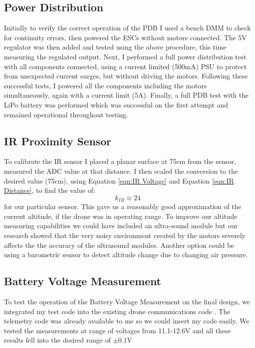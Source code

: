 \documentclass[a4paper,11pt]{article}
\begin{document}
\subsection{Power Distribution}
 Initially to verify the correct operation of the PDB I used a bench DMM to check for continuity errors, then powered the ESCs without motors connected. The 5V regulator was then added and tested using the above procedure, this time measuring the regulated output. Next, I performed a full power distribution test with all components connected, using a current limited (500mA) PSU to protect from unexpected current surges, but without driving the motors. Following these successful tests, I powered all the components including the motors simultaneously, again with a current limit (5A). Finally, a full PDB test with the LiPo battery was performed which was successful on the first attempt and remained operational throughout testing.
 
\subsection{IR Proximity Sensor}
To calibrate the IR sensor I placed a planar surface at 75cm from the sensor, measured the ADC value at that distance. I then scaled the conversion to the desired value (75cm), using Equation \ref{eqn:IR Voltage} and Equation \ref{eqn:IR Distance}, to find the value of: 
\begin{equation}
k_{IR}\approx24
\label{eqn:kIR}
\end{equation}
for our particular sensor. This gave us a reasonably good approximation of the current altitude, if the drone was in operating range. To improve our altitude measuring capabilities we could have included an ultra-sound module but our research showed that the very noisy environment created by the motors severely affects the the accuracy of the ultrasound modules. Another option could be using a barometric sensor to detect altitude change due to changing air pressure. 

\subsection{Battery Voltage Measurement}
To test the operation of the Battery Voltage Measurement on the final design, we integrated my test code into the existing drone communications code . The telemetry code was already available to me so we could insert my code easily. We tested the measurements at range of voltages from 11.1-12.6V and all these results fell into the desired range of $\pm$0.1V
\end{document}
